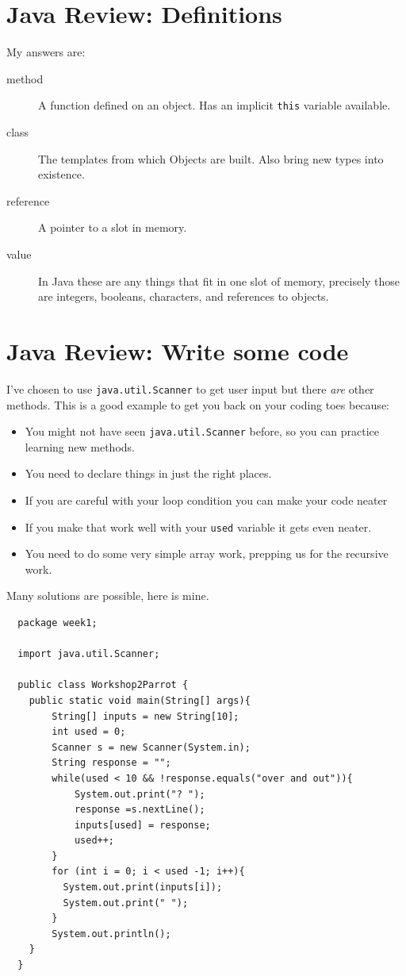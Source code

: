 \documentclass[twoside=false,DIV=14]{scrartcl}
\begin{document}
\section{Java Review: Definitions}
    My answers are:
      \begin{description}
      \item [method] A function defined on an object.  Has an implicit \lstinline|this| variable available.
      \item [class] The templates from which Objects are built.  Also bring new types into existence.
      \item [reference] A pointer to a slot in memory.
      \item [value] In Java these are any things that fit in one slot of memory, precisely those are integers, booleans, characters, and references to objects.
      \end{description}
  
\section{Java Review: Write some code}
    I've chosen to use \lstinline|java.util.Scanner| to get user input but there \emph{are} other methods.  This is a good example to get you back on your coding toes because:
    \begin{itemize}
    \item You might not have seen \lstinline|java.util.Scanner| before, so you can practice learning new methods.
    \item You need to declare things in just the right places.
    \item If you are careful with your loop condition you can make your code neater
    \item If you make that work well with your \lstinline{used} variable it gets even neater.
    \item You need to do some very simple array work, prepping us for the recursive work.
    \end{itemize}
    Many solutions are possible, here is mine.
    \begin{lstlisting}
  package week1;

  import java.util.Scanner;

  public class Workshop2Parrot {
    public static void main(String[] args){
        String[] inputs = new String[10];
        int used = 0;
        Scanner s = new Scanner(System.in);
        String response = "";
        while(used < 10 && !response.equals("over and out")){
            System.out.print("? ");
            response =s.nextLine();
            inputs[used] = response;
            used++;
        }
        for (int i = 0; i < used -1; i++){
          System.out.print(inputs[i]);
          System.out.print(" ");
        }
        System.out.println();
    }   
  }

    \end{lstlisting}
\end{document}
